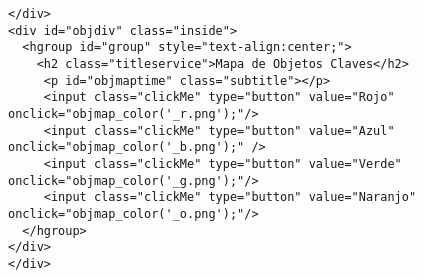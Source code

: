 \begin{enumerate}[label=\alph*) ,font=\bfseries]
\begin{lstlisting}[style=Java, caption={Obtención \textit{WebObjects}.}]
</div>
<div id="objdiv" class="inside">
  <hgroup id="group" style="text-align:center;">
    <h2 class="titleservice">Mapa de Objetos Claves</h2>
     <p id="objmaptime" class="subtitle"></p>
     <input class="clickMe" type="button" value="Rojo" onclick="objmap_color('_r.png');"/>
     <input class="clickMe" type="button" value="Azul" onclick="objmap_color('_b.png');" />
     <input class="clickMe" type="button" value="Verde" onclick="objmap_color('_g.png');"/>
     <input class="clickMe" type="button" value="Naranjo" onclick="objmap_color('_o.png');"/> 
  </hgroup>
</div>                        
</div>
\end{lstlisting}
\end{enumerate}


\newpage
